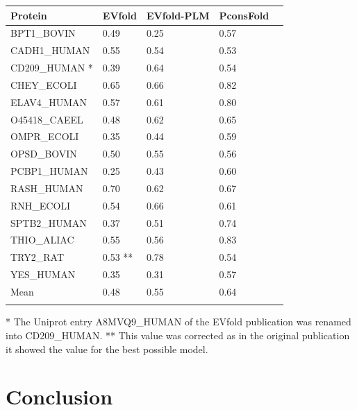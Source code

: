 \documentclass{bioinfo}
\begin{document}
\begin{table}[!t]
{\begin{tabular}{lp{1.5cm}p{1.5cm}p{1.5cm}p{1.5cm}}\toprule
Protein & EVfold  & EVfold-PLM  & PconsFold\\\midrule
BPT1\_BOVIN & 0.49 & 0.25  & 0.57 \\
CADH1\_HUMAN & 0.55 & 0.54  & 0.53 \\
CD209\_HUMAN * & 0.39 & 0.64  & 0.54 \\
CHEY\_ECOLI & 0.65 & 0.66  & 0.82 \\
ELAV4\_HUMAN & 0.57 & 0.61  & 0.80 \\
O45418\_CAEEL & 0.48 & 0.62  & 0.65 \\
OMPR\_ECOLI & 0.35 & 0.44  & 0.59 \\
OPSD\_BOVIN & 0.50 & 0.55  & 0.56 \\
PCBP1\_HUMAN & 0.25 & 0.43  & 0.60 \\
RASH\_HUMAN & 0.70 & 0.62  & 0.67 \\
RNH\_ECOLI & 0.54 & 0.66  & 0.61 \\
SPTB2\_HUMAN & 0.37 & 0.51 & 0.74 \\
THIO\_ALIAC & 0.55 & 0.56  & 0.83 \\
TRY2\_RAT & 0.53 ** & 0.78  & 0.54 \\
YES\_HUMAN & 0.35 & 0.31  & 0.57 \\ \midrule
Mean & 0.48 & 0.55  & 0.64 \\ \botrule
\end{tabular}}{* The Uniprot entry A8MVQ9\_HUMAN of the EVfold publication was renamed into CD209\_HUMAN. ** This value was corrected as in the original publication it showed the value for the best possible model.}
\end{table}


\section{Conclusion}
\end{document}
